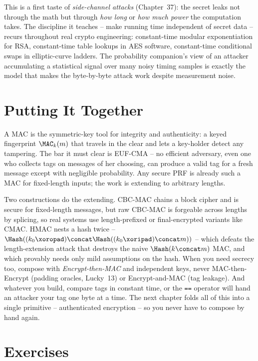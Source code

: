 \begin{connectionbox}
This is a first taste of \emph{side-channel attacks} (Chapter~37): the secret leaks not through the math but through \emph{how long} or \emph{how much power} the computation takes. The discipline it teaches -- make running time independent of secret data -- recurs throughout real crypto engineering: constant-time modular exponentiation for RSA, constant-time table lookups in AES software, constant-time conditional swaps in elliptic-curve ladders. The probability companion's view of an attacker accumulating a statistical signal over many noisy timing samples is exactly the model that makes the byte-by-byte attack work despite measurement noise.
\end{connectionbox}

\section{Putting It Together}
\label{ch15:summary}

A MAC is the symmetric-key tool for integrity and authenticity: a keyed fingerprint $\MAC_k(m)$ that travels in the clear and lets a key-holder detect any tampering. The bar it must clear is EUF-CMA -- no efficient adversary, even one who collects tags on messages of her choosing, can produce a valid tag for a fresh message except with negligible probability. Any secure PRF is already such a MAC for fixed-length inputs; the work is extending to arbitrary lengths.

Two constructions do the extending. CBC-MAC chains a block cipher and is secure for fixed-length messages, but raw CBC-MAC is forgeable across lengths by splicing, so real systems use length-prefixed or final-encrypted variants like CMAC. HMAC nests a hash twice -- $\Hash((k_0\xor\texttt{opad})\concat\Hash((k_0\xor\texttt{ipad})\concat m))$ -- which defeats the length-extension attack that destroys the naive $\Hash(k\concat m)$ MAC, and which provably needs only mild assumptions on the hash. When you need secrecy too, compose with \emph{Encrypt-then-MAC} and independent keys, never MAC-then-Encrypt (padding oracles, Lucky~13) or Encrypt-and-MAC (tag leakage). And whatever you build, compare tags in constant time, or the \texttt{==} operator will hand an attacker your tag one byte at a time. The next chapter folds all of this into a single primitive -- authenticated encryption -- so you never have to compose by hand again.

\section*{Exercises}

